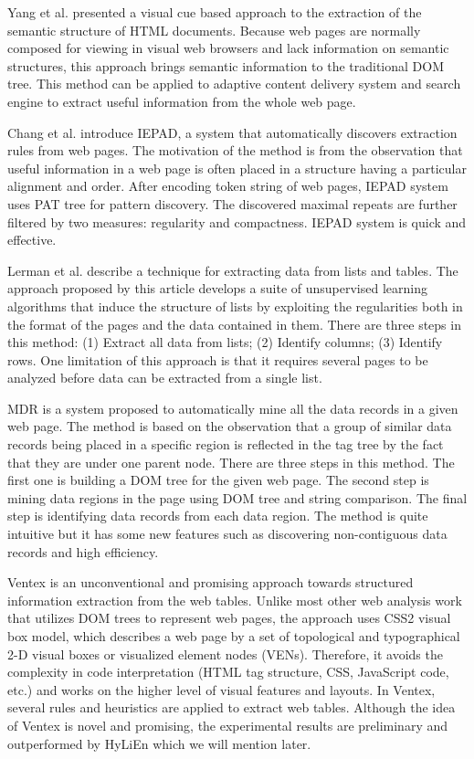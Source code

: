 Yang et al. \cite{YangZ01:VisualCues} presented a visual cue based
approach to the extraction of the semantic structure of HTML
documents.  Because web pages are normally composed for viewing in
visual web browsers and lack information on semantic structures, this
approach brings semantic information to the traditional DOM tree.
This method can be applied to adaptive content delivery system and
search engine to extract useful information from the whole web page.

Chang et al. \cite{ChangL01:IEPAD} introduce IEPAD, a system that
automatically discovers extraction rules from web pages. The
motivation of the method is from the observation that useful
information in a web page is often placed in a structure having a
particular alignment and order. After encoding token string of web
pages, IEPAD system uses PAT tree for pattern discovery. The
discovered maximal repeats are further filtered by two
measures: regularity and compactness. IEPAD system is quick and
effective.

Lerman et al.\cite{Lerman01:AutomaticData} describe a technique for
extracting data from lists and tables. The approach proposed by this
article develops a suite of unsupervised learning algorithms that
induce the structure of lists by exploiting the regularities both in
the format of the pages and the data contained in them. There are
three steps in this method: (1) Extract all data from lists; (2) Identify
columns; (3) Identify rows. One limitation of this approach is that it
requires several pages to be analyzed before data can be extracted
from a single list.

MDR \cite{LiuGZ03:MDR} is a system proposed to automatically
mine all the data records in a given web page. The method is based on
the observation that a group of similar data records being placed in a
specific region is reflected in the tag tree by the fact that they are
under one parent node. There are three steps in this method. The first
one is building a DOM tree for the given web page. The second step is
mining data regions in the page using DOM tree and string
comparison. The final step is identifying data records from each data
region. The method is quite intuitive but it has some new features
such as discovering non-contiguous data records and high efficiency.

Ventex\cite{GatterbauerBHKP2007:Towards} is an unconventional and
promising approach towards structured information extraction from the
web tables.  Unlike most other web analysis work that utilizes DOM
trees to represent web pages, the approach uses CSS2 visual box
model\cite{CCS2Box}, which describes a web page by a set of
topological and typographical 2-D visual boxes or visualized element
nodes (VENs).  Therefore, it avoids the complexity in code
interpretation (HTML tag structure, CSS, JavaScript code, etc.)  and
works on the higher level of visual features and layouts.  In Ventex,
several rules and heuristics are applied to extract web tables.
Although the idea of Ventex is novel and promising, the experimental
results are preliminary and outperformed by HyLiEn
\cite{FumarolaWBMH11:List} which we will mention later.


